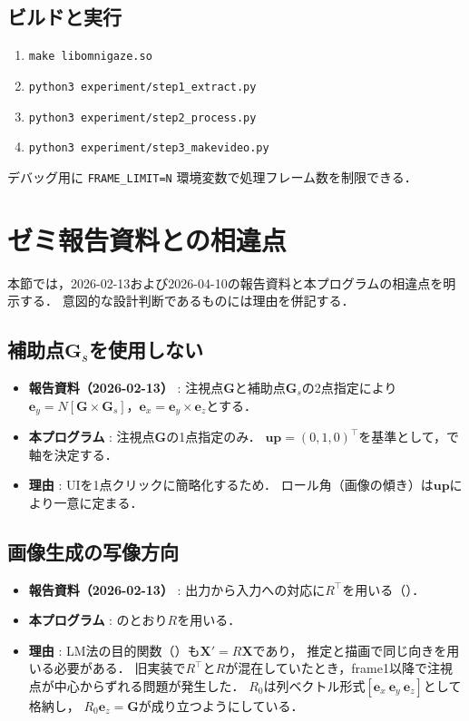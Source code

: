 \documentclass{ltjsarticle}          %
\begin{document}
\subsection{ビルドと実行}
\begin{enumerate}
  \item \texttt{make libomnigaze.so}
  \item \texttt{python3 experiment/step1\_extract.py}
  \item \texttt{python3 experiment/step2\_process.py}
  \item \texttt{python3 experiment/step3\_makevideo.py}
\end{enumerate}
デバッグ用に \texttt{FRAME\_LIMIT=N} 環境変数で処理フレーム数を制限できる．

\section{ゼミ報告資料との相違点}
本節では，2026-02-13および2026-04-10の報告資料と本プログラムの相違点を明示する．
意図的な設計判断であるものには理由を併記する．

\subsection{補助点$\bm{G}_s$を使用しない}
\label{subsec:diff_gs}
\begin{itemize}
  \item \textbf{報告資料（2026-02-13）} :
    注視点$\bm{G}$と補助点$\bm{G}_s$の2点指定により
    $\bm{e}_y = N[\bm{G} \times \bm{G}_s]$，$\bm{e}_x = \bm{e}_y \times \bm{e}_z$とする．
  \item \textbf{本プログラム} :
    注視点$\bm{G}$の1点指定のみ．
    $\bm{up} = (0,1,0)^\top$を基準として，で軸を決定する．
  \item \textbf{理由} :
    UIを1点クリックに簡略化するため．
    ロール角（画像の傾き）は$\bm{up}$により一意に定まる．
\end{itemize}

\subsection{画像生成の写像方向}
\label{subsec:diff_render}
\begin{itemize}
  \item \textbf{報告資料（2026-02-13）} :
    出力から入力への対応に$R^\top$を用いる（）．
  \item \textbf{本プログラム} :
    のとおり$R$を用いる．
  \item \textbf{理由} :
    LM法の目的関数（）も$\bm{X}' = R\bm{X}$であり，
    推定と描画で同じ向きを用いる必要がある．
    旧実装で$R^\top$と$R$が混在していたとき，frame1以降で注視点が中心からずれる問題が発生した．
    $R_0$は列ベクトル形式$[\bm{e}_x\ \bm{e}_y\ \bm{e}_z]$として格納し，
    $R_0\bm{e}_z = \bm{G}$が成り立つようにしている．
\end{itemize}
\end{document}
